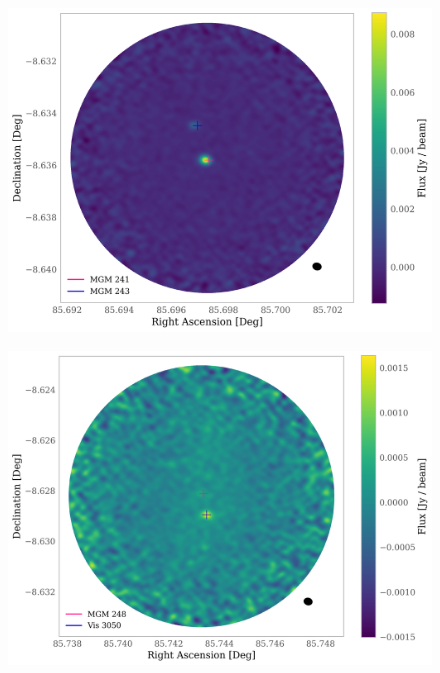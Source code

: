 \documentclass{aa}
\begin{document}
\begin{appendix}
\begin{figure}
\centering
   \includegraphics[width=\columnwidth]{MGM_241.png}
     \caption{}
\end{figure}

\begin{figure}
\centering
   \includegraphics[width=\columnwidth]{MGM_248.png}
     \caption{}
\end{figure}


\end{appendix}
\end{document}
